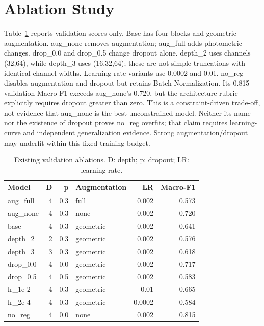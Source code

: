 \documentclass[conference]{IEEEtran}
\begin{document}
\section{Ablation Study}
Table~\ref{tab:ablation} reports validation scores only. Base has four blocks and geometric augmentation. aug\_none removes augmentation; aug\_full adds photometric changes. drop\_0.0 and drop\_0.5 change dropout alone. depth\_2 uses channels (32,64), while depth\_3 uses (16,32,64); these are not simple truncations with identical channel widths. Learning-rate variants use 0.0002 and 0.01. no\_reg disables augmentation and dropout but retains Batch Normalization. Its 0.815 validation Macro-F1 exceeds aug\_none's 0.720, but the architecture rubric explicitly requires dropout greater than zero. This is a constraint-driven trade-off, not evidence that aug\_none is the best unconstrained model. Neither its name nor the existence of dropout proves no\_reg overfits; that claim requires learning-curve and independent generalization evidence. Strong augmentation/dropout may underfit within this fixed training budget.
\begin{table}[t]\centering\caption{Existing validation ablations. D: depth; p: dropout; LR: learning rate.}\label{tab:ablation}
\scriptsize\begin{tabular}{lrrlrr}\hline
Model & D & p & Augmentation & LR & Macro-F1\\\hline
aug\_full & 4 & 0.3 & full & 0.002 & 0.573 \\
aug\_none & 4 & 0.3 & none & 0.002 & 0.720 \\
base & 4 & 0.3 & geometric & 0.002 & 0.641 \\
depth\_2 & 2 & 0.3 & geometric & 0.002 & 0.576 \\
depth\_3 & 3 & 0.3 & geometric & 0.002 & 0.618 \\
drop\_0.0 & 4 & 0.0 & geometric & 0.002 & 0.717 \\
drop\_0.5 & 4 & 0.5 & geometric & 0.002 & 0.583 \\
lr\_1e-2 & 4 & 0.3 & geometric & 0.01 & 0.665 \\
lr\_2e-4 & 4 & 0.3 & geometric & 0.0002 & 0.584 \\
no\_reg & 4 & 0.0 & none & 0.002 & 0.815 \\
\hline\end{tabular}\end{table}
\end{document}
